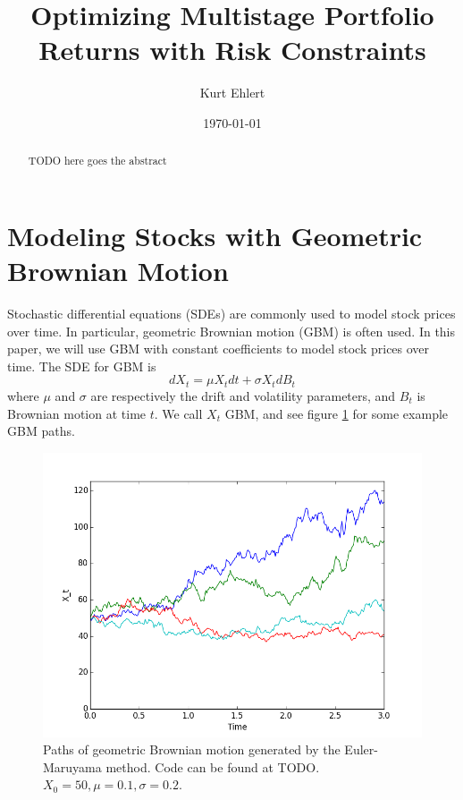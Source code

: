 \documentclass{amsart}
\title{Optimizing Multistage Portfolio Returns with Risk Constraints}
\author{Kurt Ehlert}
\date{\today}
\theoremstyle{definition}
\theoremstyle{remark}
\begin{document}
\begin{abstract}

TODO here goes the abstract

\end{abstract}

\maketitle

\tableofcontents

\section{Modeling Stocks with Geometric Brownian Motion}
Stochastic differential equations (SDEs) are commonly used to model stock prices over time. In particular,
geometric Brownian motion (GBM) is often used.\cite{hull} In this paper, we will use GBM with constant coefficients to model stock prices over time. The SDE for GBM is
\begin{equation}\label{eq:GBM_SDE}
dX_t = \mu X_t dt + \sigma X_t dB_t
\end{equation}
where $\mu$ and $\sigma$ are respectively the drift and volatility parameters, and $B_t$ is Brownian motion at time $t$. We call $X_t$ GBM, and see figure \ref{fig:mesh1} for some example GBM paths.

\begin{figure}
\centering
\includegraphics[scale=0.5]{geometric_bm.png}
\caption{Paths of geometric Brownian motion generated by the Euler-Maruyama method. Code can be found at TODO. $X_0 = 50, \mu=0.1, \sigma=0.2$.}
\label{fig:mesh1}
\end{figure}
\end{document}
